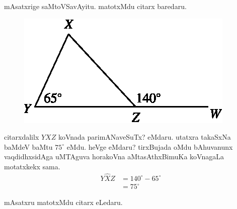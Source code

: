 mAsatxrige saMtoVSavAyitu. matotxMdu citarx baredaru.
\begin{figure}[H]
\centering
\includegraphics{src/figures/m_179c.eps}
\end{figure}
citarxdalilx $YXZ$ koVnada parimANaveSuTx? eMdaru. utatxra takaSxNa baMdeV baMtu $75^\circ$ eMdu. heVge eMdaru? tirxBujada oMdu bAhuvanunx vaqdidhxsidAga uMTAguva horakoVna aMtasAthxBimuKa koVnagaLa motatxkekx sama. 
\begin{align*}
Y\widehat{X}Z &=140^\circ-65^\circ\\
&=75^\circ
\end{align*}

mAsatxru matotxMdu citarx eLedaru.

